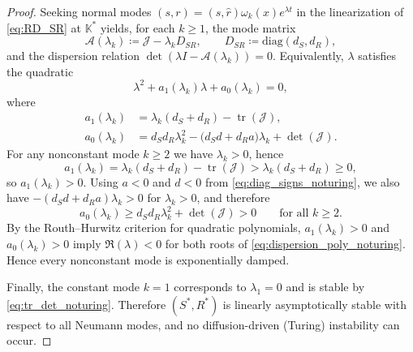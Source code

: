 \documentclass[pdflatex,sn-mathphys-ay]{sn-jnl}
\theoremstyle{thmstyleone}
\theoremstyle{definition}
\theoremstyle{remark}
\begin{document}
\begin{proof}
Seeking normal modes $(s,r)=(\hat s,\hat r)\omega_k(x)e^{\lambda t}$ in the linearization of \eqref{eq:RD_SR} at $\mathbb{K}^*$
yields, for each $k\ge1$, the mode matrix
\[
\mathcal{A}(\lambda_k)\coloneqq \mathcal{J}-\lambda_k D_{SR},
\qquad
D_{SR}\coloneqq \mathrm{diag}(d_S,d_R),
\]
and the dispersion relation $\det(\lambda I-\mathcal{A}(\lambda_k))=0$.
Equivalently, $\lambda$ satisfies the quadratic
\begin{equation}
\label{eq:dispersion_poly_noturing}
\lambda^2 + a_1(\lambda_k)\lambda + a_0(\lambda_k)=0,
\end{equation}
where
\begin{align}
\label{eq:a1a0_noturing}
a_1(\lambda_k)
&=\lambda_k(d_S+d_R)-\operatorname{tr}(\mathcal{J}),
\nonumber\\[4pt]
a_0(\lambda_k)
&=d_Sd_R\lambda_k^2-\bigl(d_S d + d_R a\bigr)\lambda_k+\det(\mathcal{J}).
\end{align}
For any nonconstant mode $k\ge2$ we have $\lambda_k>0$, hence
\[
a_1(\lambda_k)=\lambda_k(d_S+d_R)-\operatorname{tr}(\mathcal{J})>\lambda_k(d_S+d_R)\ge0,
\]
so $a_1(\lambda_k)>0$.
Using $a<0$ and $d<0$ from \eqref{eq:diag_signs_noturing}, we also have $-(d_S d+d_R a)\lambda_k>0$ for $\lambda_k>0$, and therefore
\[
a_0(\lambda_k)\ge d_Sd_R\lambda_k^2+\det(\mathcal{J})>0
\qquad \text{for all }k\ge2.
\]
By the Routh--Hurwitz criterion for quadratic polynomials, $a_1(\lambda_k)>0$ and $a_0(\lambda_k)>0$ imply
$\Re(\lambda)<0$ for both roots of \eqref{eq:dispersion_poly_noturing}. Hence every nonconstant mode is exponentially damped.

Finally, the constant mode $k=1$ corresponds to $\lambda_1=0$ and is stable by \eqref{eq:tr_det_noturing}.
Therefore $(S^*,R^*)$ is linearly asymptotically stable with respect to all Neumann modes, and no diffusion-driven
(Turing) instability can occur.
\end{proof}
\end{document}
